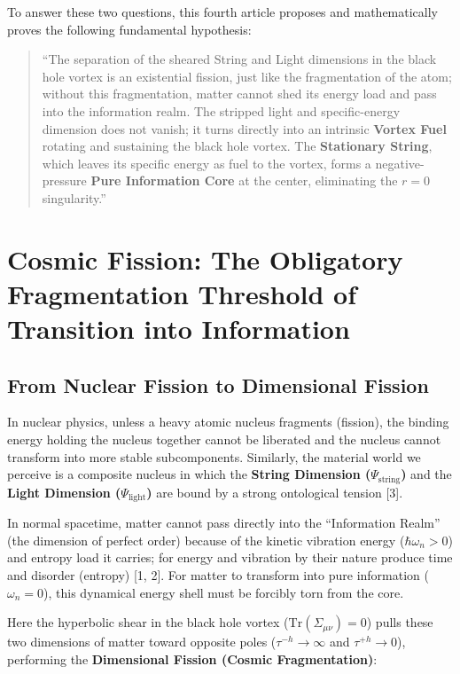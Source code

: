 \documentclass[12pt,a4paper]{article}
\begin{document}
To answer these two questions, this fourth article proposes and mathematically proves the following fundamental hypothesis:

\begin{quote}
``The separation of the sheared String and Light dimensions in the black hole vortex is an existential fission, just like the fragmentation of the atom; without this fragmentation, matter cannot shed its energy load and pass into the information realm. The stripped light and specific-energy dimension does not vanish; it turns directly into an intrinsic \textbf{Vortex Fuel} rotating and sustaining the black hole vortex. The \textbf{Stationary String}, which leaves its specific energy as fuel to the vortex, forms a negative-pressure \textbf{Pure Information Core} at the center, eliminating the $r=0$ singularity.''
\end{quote}

\section{Cosmic Fission: The Obligatory Fragmentation Threshold of Transition into Information}

\subsection{From Nuclear Fission to Dimensional Fission}

In nuclear physics, unless a heavy atomic nucleus fragments (fission), the binding energy holding the nucleus together cannot be liberated and the nucleus cannot transform into more stable subcomponents. Similarly, the material world we perceive is a composite nucleus in which the \textbf{String Dimension ($\Psi_{\text{string}}$)} and the \textbf{Light Dimension ($\Psi_{\text{light}}$)} are bound by a strong ontological tension [3].

In normal spacetime, matter cannot pass directly into the ``Information Realm'' (the dimension of perfect order) because of the kinetic vibration energy ($\hbar \omega_n > 0$) and entropy load it carries; for energy and vibration by their nature produce time and disorder (entropy) [1, 2]. For matter to transform into pure information ($\omega_n = 0$), this dynamical energy shell must be forcibly torn from the core.

Here the hyperbolic shear in the black hole vortex ($\text{Tr}(\Sigma_{\mu\nu}) = 0$) pulls these two dimensions of matter toward opposite poles ($\tau^{-h} \to \infty$ and $\tau^{+h} \to 0$), performing the \textbf{Dimensional Fission (Cosmic Fragmentation)}:
\end{document}
